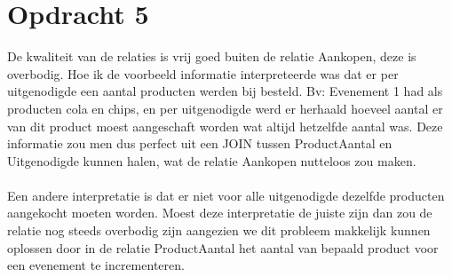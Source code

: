\documentclass[a4paper]{article}
\begin{document}
\newpage
\section{Opdracht 5}
De kwaliteit van de relaties is vrij goed buiten de relatie Aankopen, deze is overbodig. Hoe ik de voorbeeld informatie interpreteerde was dat er per uitgenodigde een aantal producten werden bij besteld. Bv: Evenement 1 had als producten cola en chips, en per uitgenodigde werd er herhaald hoeveel aantal er van dit product moest aangeschaft worden wat altijd hetzelfde aantal was. Deze informatie zou men dus perfect uit een JOIN tussen ProductAantal en Uitgenodigde kunnen halen, wat de relatie Aankopen nutteloos zou maken.\\\\
Een andere interpretatie is dat er niet voor alle uitgenodigde dezelfde producten aangekocht moeten worden. Moest deze interpretatie de juiste zijn dan zou de relatie nog steeds overbodig zijn aangezien we dit probleem makkelijk kunnen oplossen door in de relatie ProductAantal het aantal van bepaald product voor een evenement te incrementeren.\\\\
\end{document}
